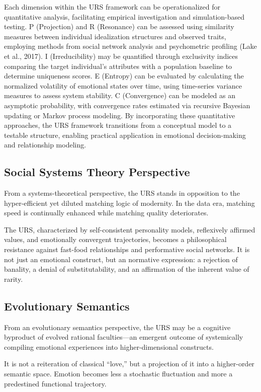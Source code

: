 \documentclass{article}
\begin{document}
Each dimension within the URS framework can be operationalized for quantitative analysis, facilitating empirical investigation and simulation-based testing. P (Projection) and R (Resonance) can be assessed using similarity measures between individual idealization structures and observed traits, employing methods from social network analysis and psychometric profiling (Lake et al., 2017). I (Irreducibility) may be quantified through exclusivity indices comparing the target individual's attributes with a population baseline to determine uniqueness scores. E (Entropy) can be evaluated by calculating the normalized volatility of emotional states over time, using time-series variance measures to assess system stability. C (Convergence) can be modeled as an asymptotic probability, with convergence rates estimated via recursive Bayesian updating or Markov process modeling. By incorporating these quantitative approaches, the URS framework transitions from a conceptual model to a testable structure, enabling practical application in emotional decision-making and relationship modeling.

\subsection{Social Systems Theory Perspective}

From a systems-theoretical perspective, the URS stands in opposition to the hyper-efficient yet diluted matching logic of modernity. In the data era, matching speed is continually enhanced while matching quality deteriorates.

The URS, characterized by self-consistent personality models, reflexively affirmed values, and emotionally convergent trajectories, becomes a philosophical resistance against fast-food relationships and performative social networks. It is not just an emotional construct, but an normative expression: a rejection of banality, a denial of substitutability, and an affirmation of the inherent value of rarity.

\subsection{Evolutionary Semantics}

From an evolutionary semantics perspective, the URS may be a cognitive byproduct of evolved rational faculties—an emergent outcome of systemically compiling emotional experiences into higher-dimensional constructs.

It is not a reiteration of classical “love,” but a projection of it into a higher-order semantic space. Emotion becomes less a stochastic fluctuation and more a predestined functional trajectory.
\end{document}
